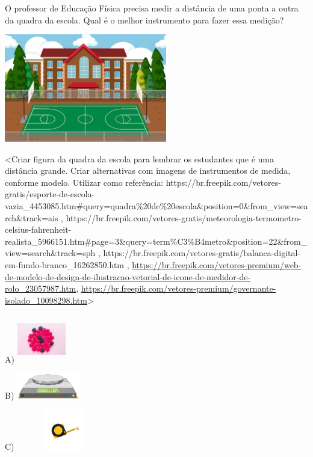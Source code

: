 \begin{escolha}
\begin{escolha}
{{{{O professor de Educação Física precisa medir a distância de uma ponta a
outra da quadra da escola. Qual é o melhor instrumento para fazer essa
medição?

\includegraphics[width=2.79514in,height=1.86343in]{media/image131.jpeg}

\textless{}Criar figura da quadra da escola para lembrar os estudantes
que é uma distância grande. Criar alternativas com imagens de
instrumentos de medida, conforme modelo. Utilizar como referência:
https://br.freepik.com/vetores-gratis/esporte-de-escola-vazia\_4453085.htm\#query=quadra\%20de\%20escola\&position=0\&from\_view=search\&track=ais
,
https://br.freepik.com/vetores-gratis/meteorologia-termometro-celsius-fahrenheit-realista\_5966151.htm\#page=3\&query=term\%C3\%B4metro\&position=22\&from\_view=search\&track=sph
,
https://br.freepik.com/vetores-gratis/balanca-digital-em-fundo-branco\_16262850.htm
,
\url{https://br.freepik.com/vetores-premium/web-de-modelo-de-design-de-ilustracao-vetorial-de-icone-de-medidor-de-rolo_23057987.htm},
\url{https://br.freepik.com/vetores-premium/governante-isolado_10098298.htm}\textgreater{}

A)
\includegraphics[width=0.83333in,height=0.83333in]{media/image132.png}

B)
\includegraphics[width=1.08507in,height=0.42273in]{media/image133.png}

C)
\includegraphics[width=1.63194in,height=0.70267in]{media/image134.png}

}}}}
\end{escolha}
\end{escolha}

